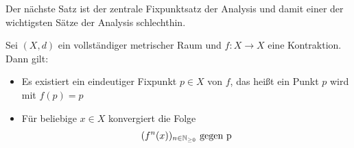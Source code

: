 Der nächste Satz ist der zentrale Fixpunktsatz der Analysis und damit einer der 
wichtigsten Sätze der Analysis schlechthin.

\begin{theorem}\label{vl_26_theorem_1}
	\label{banachscherfixpunktsatz} %
	Sei $(X,d)$ ein vollständiger metrischer Raum und $f: X \rightarrow X$ eine 
	Kontraktion. Dann gilt:
	\begin{itemize}
		\item Es existiert ein eindeutiger Fixpunkt $p \in X$ von $f$, das heißt 
			ein Punkt $p$ wird mit $f(p) = p$ 
		\item Für beliebige $x \in X$ konvergiert die Folge
			\begin{align*}
				(f^n(x))_{n \in \mathbb{N}_{\geq 0}} \text{ gegen p}
			\end{align*}
	\end{itemize}
\end{theorem}


